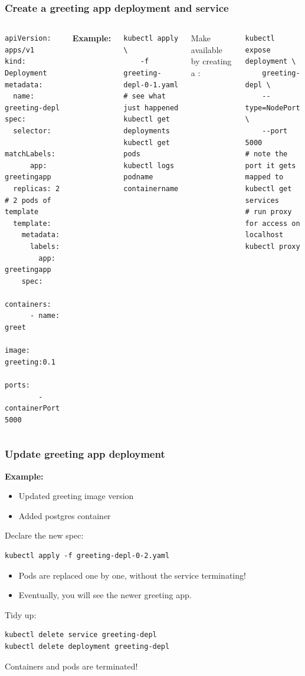 \begin{frame}[fragile]
	\frametitle{Create a greeting app deployment and service}
	\vspace{-.2cm}\begin{columns}
		\begin{lstlisting}
apiVersion: apps/v1
kind: Deployment
metadata:
  name: greeting-depl
spec:
  selector:
	matchLabels:
	  app: greetingapp
  replicas: 2 # 2 pods of template
  template:
	metadata:
	  labels:
		app: greetingapp
	spec:
	  containers:
	  - name: greet
		image: greeting:0.1
		ports:
		- containerPort: 5000
		\end{lstlisting}
	
		\textbf{Example:} 
		\begin{lstlisting}
kubectl apply \
	-f greeting-depl-0-1.yaml
# see what just happened
kubectl get deployments
kubectl get pods
kubectl logs podname containername
		\end{lstlisting}

		Make available by creating a :
		\begin{lstlisting}
kubectl expose deployment \
	greeting-depl \
	--type=NodePort \
	--port 5000
# note the port it gets mapped to
kubectl get services
# run proxy for access on localhost
kubectl proxy
		\end{lstlisting}
	\end{columns}
\end{frame}

\begin{frame}[fragile]
	\frametitle{Update greeting app deployment}

		\textbf{Example:} 
		\begin{itemize}
			\item Updated greeting image version
			\item Added postgres container
		\end{itemize}
		Declare the new spec:
		\begin{lstlisting}
kubectl apply -f greeting-depl-0-2.yaml
		\end{lstlisting}
	\begin{itemize}
		\item Pods are replaced one by one, without the service terminating!
		\item Eventually, you will see the newer greeting app.
		\end{itemize}
		
		Tidy up:
		\begin{lstlisting}
kubectl delete service greeting-depl
kubectl delete deployment greeting-depl
		\end{lstlisting}
		Containers and pods are terminated!
		
	
\end{frame}

